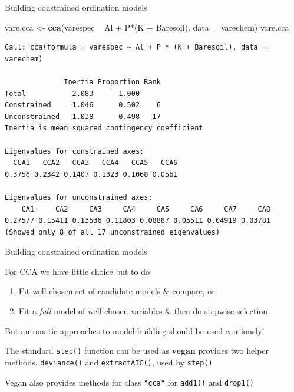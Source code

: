 \documentclass[10pt,ignorenonframetext,compress, aspectratio=169]{beamer}
\newenvironment{Shaded}{\begin{snugshade}}{\end{snugshade}}
\newcommand{\KeywordTok}[1]{\textcolor[rgb]{0.13,0.29,0.53}{\textbf{{#1}}}}
\newcommand{\DataTypeTok}[1]{\textcolor[rgb]{0.13,0.29,0.53}{{#1}}}
\newcommand{\StringTok}[1]{\textcolor[rgb]{0.31,0.60,0.02}{{#1}}}
\newcommand{\NormalTok}[1]{{#1}}
\providecommand{\tightlist}{%
  \setlength{\itemsep}{0pt}\setlength{\parskip}{0pt}}
\begin{document}
\begin{frame}[fragile]{Building constrained ordination models}

\scriptsize

\begin{Shaded}
\begin{Highlighting}[]
\NormalTok{vare.cca <-}\StringTok{ }\KeywordTok{cca}\NormalTok{(varespec ~}\StringTok{ }\NormalTok{Al +}\StringTok{ }\NormalTok{P*(K +}\StringTok{ }\NormalTok{Baresoil), }\DataTypeTok{data =} \NormalTok{varechem)}
\NormalTok{vare.cca}
\end{Highlighting}
\end{Shaded}

\begin{verbatim}
Call: cca(formula = varespec ~ Al + P * (K + Baresoil), data =
varechem)

              Inertia Proportion Rank
Total           2.083      1.000     
Constrained     1.046      0.502    6
Unconstrained   1.038      0.498   17
Inertia is mean squared contingency coefficient 

Eigenvalues for constrained axes:
  CCA1   CCA2   CCA3   CCA4   CCA5   CCA6 
0.3756 0.2342 0.1407 0.1323 0.1068 0.0561 

Eigenvalues for unconstrained axes:
    CA1     CA2     CA3     CA4     CA5     CA6     CA7     CA8 
0.27577 0.15411 0.13536 0.11803 0.08887 0.05511 0.04919 0.03781 
(Showed only 8 of all 17 unconstrained eigenvalues)
\end{verbatim}

\normalsize

\end{frame}

\begin{frame}[fragile]{Building constrained ordination models}

For CCA we have little choice but to do

\begin{enumerate}
\def\labelenumi{\arabic{enumi}.}
\tightlist
\item
  Fit well-chosen set of candidate models \& compare, or
\item
  Fit a \emph{full} model of well-chosen variables \& then do stepwise
  selection
\end{enumerate}

But automatic approaches to model building should be used cautiously!

The standard \texttt{step()} function can be used as \textbf{vegan}
provides two helper methods, \texttt{deviance()} and
\texttt{extractAIC()}, used by \texttt{step()}

Vegan also provides methods for class \texttt{"cca"} for \texttt{add1()}
and \texttt{drop1()}

\end{frame}
\end{document}
